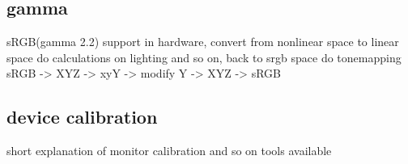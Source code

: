 \subsection{gamma}
sRGB(gamma 2.2) support in hardware, convert from nonlinear space to linear
space do calculations on lighting and so on, back to srgb space
do tonemapping sRGB -> XYZ -> xyY -> modify Y -> XYZ -> sRGB

\subsection{device calibration}
short explanation of monitor calibration and so on
tools available
